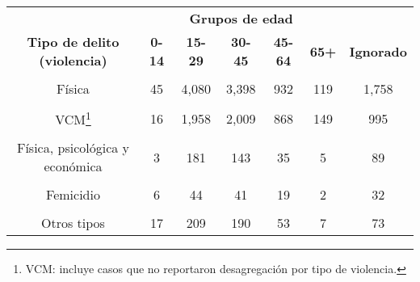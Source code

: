 \begin{tabular}[t]{ccccccc}
\toprule
\multicolumn{1}{c}{\textbf{ }} & \multicolumn{5}{c}{\textbf{Grupos de edad}} & \multicolumn{1}{c}{\textbf{ }} \\
\cmidrule(l{3pt}r{3pt}){2-6}
\textbf{Tipo de delito (violencia)} & \textbf{0-14} & \textbf{15-29} & \textbf{30-45} & \textbf{45-64} & \textbf{65+} & \textbf{Ignorado}\\
\midrule
\cellcolor[HTML]{A8A4FB}{Psicológica} & \cellcolor[HTML]{A8A4FB}{58} & \cellcolor[HTML]{A8A4FB}{5,765} & \cellcolor[HTML]{A8A4FB}{5,921} & \cellcolor[HTML]{A8A4FB}{2,193} & \cellcolor[HTML]{A8A4FB}{348} & \cellcolor[HTML]{A8A4FB}{3,162}\\
Física & 45 & 4,080 & 3,398 & 932 & 119 & 1,758\\
\cellcolor[HTML]{A8A4FB}{Física y psicológica} & \cellcolor[HTML]{A8A4FB}{35} & \cellcolor[HTML]{A8A4FB}{3,841} & \cellcolor[HTML]{A8A4FB}{3,011} & \cellcolor[HTML]{A8A4FB}{829} & \cellcolor[HTML]{A8A4FB}{90} & \cellcolor[HTML]{A8A4FB}{1,772}\\
VCM\footnote{VCM: incluye casos que no reportaron desagregación por tipo de violencia.} & 16 & 1,958 & 2,009 & 868 & 149 & 995\\
\cellcolor[HTML]{A8A4FB}{Psicológica y económica} & \cellcolor[HTML]{A8A4FB}{NA} & \cellcolor[HTML]{A8A4FB}{183} & \cellcolor[HTML]{A8A4FB}{221} & \cellcolor[HTML]{A8A4FB}{89} & \cellcolor[HTML]{A8A4FB}{23} & \cellcolor[HTML]{A8A4FB}{89}\\
Física, psicológica y económica & 3 & 181 & 143 & 35 & 5 & 89\\
\cellcolor[HTML]{A8A4FB}{VCM y económica} & \cellcolor[HTML]{A8A4FB}{NA} & \cellcolor[HTML]{A8A4FB}{96} & \cellcolor[HTML]{A8A4FB}{124} & \cellcolor[HTML]{A8A4FB}{50} & \cellcolor[HTML]{A8A4FB}{6} & \cellcolor[HTML]{A8A4FB}{58}\\
Femicidio & 6 & 44 & 41 & 19 & 2 & 32\\
\cellcolor[HTML]{A8A4FB}{Física y económica} & \cellcolor[HTML]{A8A4FB}{1} & \cellcolor[HTML]{A8A4FB}{46} & \cellcolor[HTML]{A8A4FB}{42} & \cellcolor[HTML]{A8A4FB}{10} & \cellcolor[HTML]{A8A4FB}{NA} & \cellcolor[HTML]{A8A4FB}{21}\\
Otros tipos & 17 & 209 & 190 & 53 & 7 & 73\\
\bottomrule
\end{tabular}
